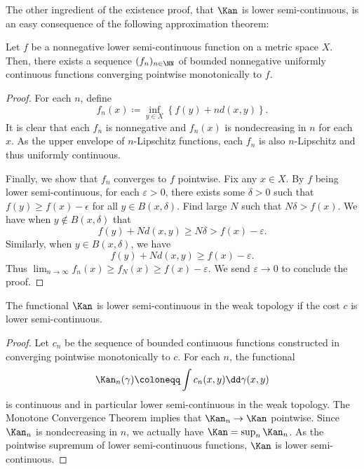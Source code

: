 \documentclass[oneside,reqno,letterpaper]{amsart}
\begin{document}
The other ingredient of the existence proof, that \(\Kan\) is lower semi-continuous, is an easy consequence of the following approximation theorem:
\begin{lemma}\label{prop:lsc-approx-by-uc}
  Let \(f\) be a nonnegative lower semi-continuous function on a metric space \(X\).
  Then, there exists a sequence \((f_n)_{n \in \NN}\) of bounded nonnegative uniformly continuous functions converging pointwise monotonically to \(f\).
\end{lemma}
\begin{proof}
  For each \(n\), define
  \[
    f_n(x) \coloneqq \inf_{y \in X} \left\{ f(y) + n d(x, y) \right\}.
  \]
  It is clear that each \(f_n\) is nonnegative and \(f_n(x)\) is nondecreasing in \(n\) for each \(x\).
  As the upper envelope of \(n\)-Lipschitz functions, each \(f_n\) is also \(n\)-Lipschitz and thus uniformly continuous.

  Finally, we show that \(f_n\) converges to \(f\) pointwise.
  Fix any \(x \in X\).
  By \(f\) being lower semi-continuous, for each \(\varepsilon > 0\), there exists some \(\delta > 0\) such that \(f(y) \geq f(x) - \epsilon\) for all \(y \in B(x, \delta)\).
  Find large \(N\) such that \(N \delta > f(x)\).
  We have when \(y \notin B(x, \delta)\) that
  \[
    f(y) + N d(x, y)
    \geq N \delta
    > f(x) - \varepsilon.
  \]
  Similarly, when \(y \in B(x, \delta)\), we have
  \[
    f(y) + N d(x, y)
    \geq f(x) - \varepsilon.
  \]
  Thus \(\lim_{n \to \infty} f_n(x) \geq f_N(x) \geq f(x) - \varepsilon\).
  We send \(\varepsilon \to 0\) to conclude the proof.
\end{proof}
\begin{corollary}\label{prop:kan-lsc}
  The functional \(\Kan\) is lower semi-continuous in the weak topology if the cost \(c\) is lower semi-continuous.
\end{corollary}
\begin{proof}
  Let \(c_n\) be the sequence of bounded continuous functions constructed in  converging pointwise monotonically to \(c\).
  For each \(n\), the functional
  \[
    \Kan_n(\gamma) \coloneqq \int c_n(x, y) \dd \gamma(x, y)
  \]
  is continuous and in particular lower semi-continuous in the weak topology.
  The Monotone Convergence Theorem implies that \(\Kan_n \to \Kan\) pointwise.
  Since \(\Kan_n\) is nondecreasing in \(n\), we actually have \(\Kan = \sup_n \Kan_n\). %
  As the pointwise supremum of lower semi-continuous functions, \(\Kan\) is lower semi-continuous.
\end{proof}
\end{document}
